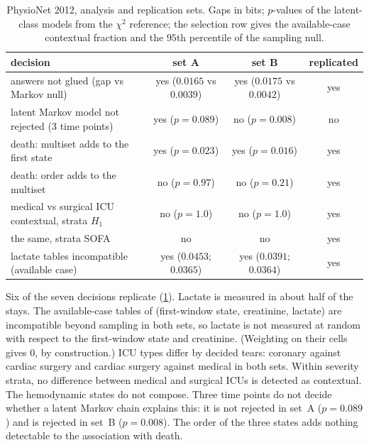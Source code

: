 \documentclass[11pt]{article}
\theoremstyle{definition}
\theoremstyle{remark}
\begin{document}
\begin{table}[ht]
\centering\footnotesize
\caption{PhysioNet 2012, analysis and replication sets. Gaps in bits; $p$-values of the latent-class models from the $\chi^2$ reference; the
selection row gives the available-case contextual fraction and the $95$th percentile of the sampling null.}\label{tab:icu}
\begin{tabular}{lccc}
\toprule
decision & set A & set B & replicated\\
\midrule
answers not glued (gap vs Markov null) & yes ($0.0165$ vs $0.0039$) & yes ($0.0175$ vs $0.0042$) & yes\\
latent Markov model not rejected (3 time points) & yes ($p=0.089$) & no ($p=0.008$) & no\\
death: multiset adds to the first state & yes ($p=0.023$) & yes ($p=0.016$) & yes\\
death: order adds to the multiset & no ($p=0.97$) & no ($p=0.21$) & yes\\
medical vs surgical ICU contextual, strata $H_1$ & no ($p=1.0$) & no ($p=1.0$) & yes\\
the same, strata SOFA & no & no & yes\\
lactate tables incompatible (available case) & yes ($0.0453$; $0.0365$) & yes ($0.0391$; $0.0364$) & yes\\
\bottomrule
\end{tabular}
\end{table}

Six of the seven decisions replicate (\cref{tab:icu}). Lactate is measured in about half of the stays. The available-case tables of
(first-window state, creatinine, lactate) are incompatible beyond sampling in both sets, so lactate is not measured at random with
respect to the first-window state and creatinine. (Weighting on their cells gives $0$, by construction.) ICU types differ by decided tears:
coronary against cardiac surgery and cardiac surgery against medical in both sets. Within severity strata, no difference between medical
and surgical ICUs is detected as contextual. The hemodynamic states do not compose. Three time points do not decide whether a latent
Markov chain explains this: it is not rejected in set~A ($p=0.089$) and is rejected in set~B ($p=0.008$). The order of the three states
adds nothing detectable to the association with death.
\end{document}
